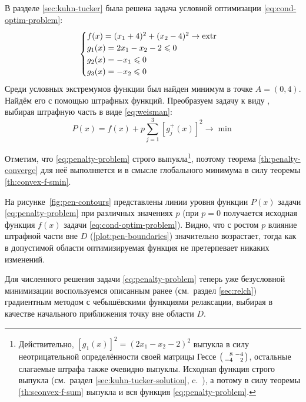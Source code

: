 В разделе \ref{sec:kuhn-tucker} была решена задача условной
оптимизации \eqref{eq:cond-optim-problem}:
\begin{equation*}
  \begin{cases}
    f(x) = (x_1+4)^2 + (x_2-4)^2 \to \operatorname{extr} \\
    g_1(x) = 2x_1 - x_2 - 2 \leqslant 0 \\
    g_2(x) = -x_1 \leqslant 0 \\
    g_3(x) = -x_2 \leqslant 0
  \end{cases}
\end{equation*}
Среди условных экстремумов функции был найден минимум в точке $A = (0,
4)$. Найдём его с помощью штрафных функций. Преобразуем задачу к виду
\label{eq:penalty-iter}, выбирая штрафную часть в виде
\eqref{eq:weisman}:
\begin{equation}
  \label{eq:penalty-problem}
  P(x) = f(x) + p \sum_{j=1}^3{ \left [ g_j^+(x) \right ]^2} \to \min
\end{equation}

Отметим, что \eqref{eq:penalty-problem} строго
выпукла\footnote[1]{Действительно, $\left[g_1(x)\right]^2=(2x_1-x_2-2)^2$
  выпукла в силу неотрицательной определённости своей матрицы Гессе
  $\left(\begin{smallmatrix}\phm{}8&-4\\-4&\phm{}2 \end{smallmatrix}\right)$, остальные
  слагаемые штрафа также очевидно выпуклы. Исходная функция строго
  выпукла (см.~раздел \ref{sec:kuhn-tucker-solution},
  c.~\pageref{eq:cond-optim-hess}), а потому в силу теоремы
  \ref{th:sconvex-f-sum} выпукла и вся функция
  \eqref{eq:penalty-problem}.}, поэтому теорема
\ref{th:penalty-converge} для неё выполняется и в смысле глобального
минимума в силу теоремы \ref{th:convex-f-smin}.

На рисунке \ref{fig:pen-contours} представлены линии уровня функции
$P(x)$ задачи \eqref{eq:penalty-problem} при различных значениях $p$
(при $p=0$ получается исходная функция $f(x)$ задачи
\eqref{eq:cond-optim-problem}). Видно, что с ростом $p$ влияние
штрафной части вне $D$ (\ref{plot:pen-boundaries}) значительно
возрастает, тогда как в допустимой области оптимизируемая функция не
претерпевает никаких изменений.



Для численного решения задачи \eqref{eq:penalty-problem} теперь уже
безусловной минимизации воспользуемся описанным ранее (см. раздел
\ref{sec:relch}) градиентным методом с чебышёвскими функциями
релаксации, выбирая в качестве начального приближения точку вне
области $D$.

